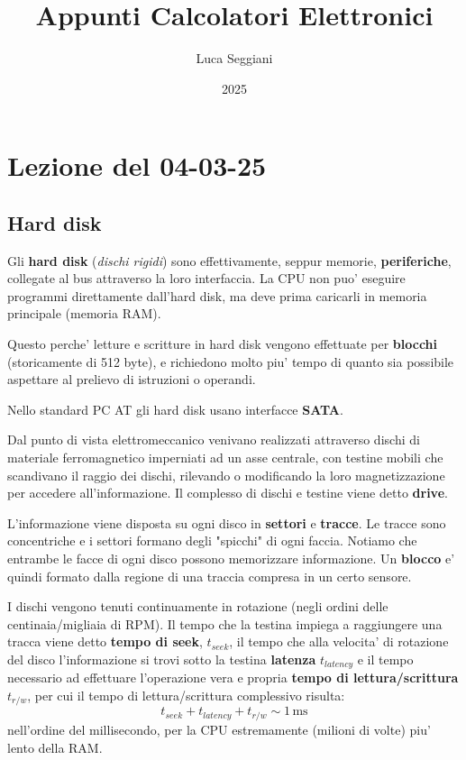 \documentclass[a4paper,11pt]{article}
\title{Appunti Calcolatori Elettronici}
\author{Luca Seggiani}
\date{2025}
\begin{document}
\section{Lezione del 04-03-25}

\thispagestyle{empty}
\pagestyle{fancy}

\subsection{Hard disk}
Gli \textbf{hard disk} (\textit{dischi rigidi}) sono effettivamente, seppur memorie, \textbf{periferiche}, collegate al bus attraverso la loro interfaccia.
La CPU non puo' eseguire programmi direttamente dall'hard disk, ma deve prima caricarli in memoria principale (memoria RAM).

	Questo perche' letture e scritture in hard disk vengono effettuate per \textbf{blocchi} (storicamente di 512 byte), e richiedono molto piu' tempo di quanto sia possibile aspettare al prelievo di istruzioni o operandi.

Nello standard PC AT gli hard disk usano interfacce \textbf{SATA}.

Dal punto di vista elettromeccanico venivano realizzati attraverso dischi di materiale ferromagnetico imperniati ad un asse centrale, con testine mobili che scandivano il raggio dei dischi, rilevando o modificando la loro magnetizzazione per accedere all'informazione.
Il complesso di dischi e testine viene detto \textbf{drive}.

L'informazione viene disposta su ogni disco in \textbf{settori} e \textbf{tracce}.
Le tracce sono concentriche e i settori formano degli "spicchi" di ogni faccia.
Notiamo che entrambe le facce di ogni disco possono memorizzare informazione.
Un \textbf{blocco} e' quindi formato dalla regione di una traccia compresa in un certo sensore.

I dischi vengono tenuti continuamente in rotazione (negli ordini delle centinaia/migliaia di RPM).
Il tempo che la testina impiega a raggiungere una tracca viene detto \textbf{tempo di seek}, $t_{seek}$, il tempo che alla velocita' di rotazione del disco l'informazione si trovi sotto la testina \textbf{latenza} $t_{latency}$ e il tempo necessario ad effettuare l'operazione vera e propria \textbf{tempo di lettura/scrittura} $t_{r/w}$, per cui il tempo di lettura/scrittura complessivo risulta:
$$
t_{seek} + t_{latency} + t_{r/w} \sim 1 \, \mathrm{ms}
$$
nell'ordine del millisecondo, per la CPU estremamente (milioni di volte) piu' lento della RAM.
\end{document}
